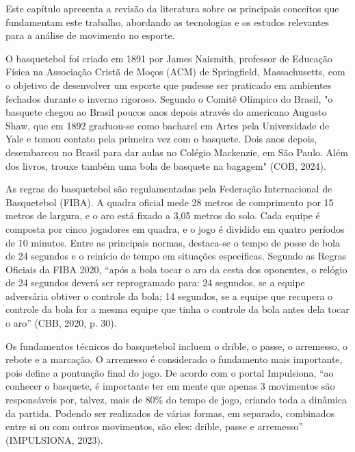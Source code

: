 \label{cap:revisao-literatura}

Este capítulo apresenta a revisão da literatura sobre os principais conceitos que fundamentam este trabalho, abordando as tecnologias e os estudos relevantes para a análise de movimento no esporte.

\label{sec:basquete}

O basquetebol foi criado em 1891 por James Naismith, professor de Educação Física na Associação Cristã de Moços (ACM) de Springfield, Massachusetts, 
com o objetivo de desenvolver um esporte que pudesse ser praticado em ambientes fechados durante o inverno rigoroso. Segundo o Comitê Olímpico do Brasil, 
"o basquete chegou ao Brasil poucos anos depois através do americano Augusto Shaw, que em 1892 graduou-se como bacharel em Artes pela Universidade de Yale e tomou contato pela primeira vez com o basquete. 
Dois anos depois, desembarcou no Brasil para dar aulas no Colégio Mackenzie, em São Paulo. Além dos livros, trouxe também uma bola de basquete na bagagem" (COB, 2024).

As regras do basquetebol são regulamentadas pela Federação Internacional de Basquetebol (FIBA). A quadra oficial mede 28 metros de comprimento por 15 metros de largura, 
e o aro está fixado a 3,05 metros do solo. Cada equipe é composta por cinco jogadores em quadra, e o jogo é dividido em quatro períodos de 10 minutos. 
Entre as principais normas, destaca-se o tempo de posse de bola de 24 segundos e o reinício de tempo em situações específicas. Segundo as Regras Oficiais da FIBA 2020, 
“após a bola tocar o aro da cesta dos oponentes, o relógio de 24 segundos deverá ser reprogramado para: 24 segundos, se a equipe adversária obtiver o controle da bola; 
14 segundos, se a equipe que recupera o controle da bola for a mesma equipe que tinha o controle da bola antes dela tocar o aro” (CBB, 2020, p. 30).

Os fundamentos técnicos do basquetebol incluem o drible, o passe, o arremesso, o rebote e a marcação. O arremesso é considerado o fundamento mais importante, pois define a pontuação final do jogo. 
De acordo com o portal Impulsiona, ``ao conhecer o basquete, é importante ter em mente que apenas 3 movimentos são responsáveis por, talvez, mais de 80\% do tempo de jogo, criando toda a dinâmica da partida. 
Podendo ser realizados de várias formas, em separado, combinados entre si ou com outros movimentos, são eles: drible, passe e arremesso'' (IMPULSIONA, 2023).

